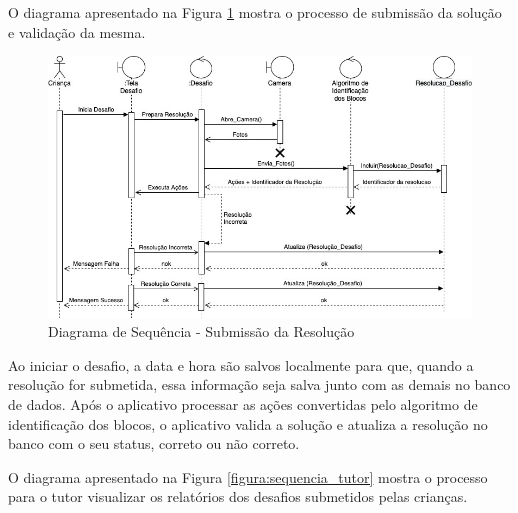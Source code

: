         
        O diagrama apresentado na Figura \ref{figura:sequencia_jogo} mostra o processo de submissão da solução e validação da mesma.
        
        \begin{figure}[H]
            \caption{Diagrama de Sequência - Submissão da Resolução}
            \centering
                \includegraphics[width=\linewidth]{Imagens/Cap3/Sequencia_Jogo.jpg}
    
            \label{figura:sequencia_jogo}
        \end{figure}
        
        Ao iniciar o desafio, a data e hora são salvos localmente para que, quando a resolução for submetida, essa informação seja salva junto com as demais no banco de dados. Após o aplicativo processar as ações convertidas pelo algoritmo de identificação dos blocos, o aplicativo valida a solução e atualiza a resolução no banco com o seu status, correto ou não correto.
        
        
        O diagrama apresentado na Figura \ref{figura:sequencia_tutor} mostra o processo para o tutor visualizar os relatórios dos desafios submetidos pelas crianças.
        
